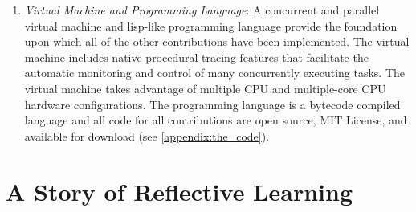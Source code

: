 \begin{enumerate}
\item \emph{Virtual Machine and Programming Language}: A concurrent
  and parallel virtual machine and lisp-like programming language
  provide the foundation upon which all of the other contributions
  have been implemented.  The virtual machine includes native
  procedural tracing features that facilitate the automatic monitoring
  and control of many concurrently executing tasks.  The virtual
  machine takes advantage of multiple CPU and multiple-core CPU
  hardware configurations.  The programming language is a bytecode
  compiled language and all code for all contributions are open
  source, MIT License, and available for download (see
  {\mbox{\autoref{appendix:the_code}}}).
\end{enumerate}

\section{A Story of Reflective Learning}

